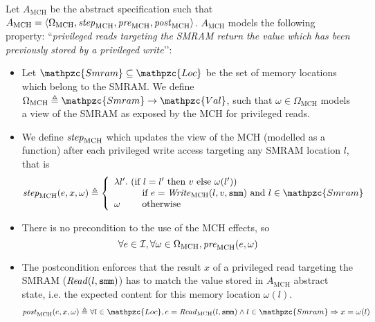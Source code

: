 \begin{example} \label{ex:mch-abs-specs} Let
  $A_{\mathrm{MCH}}$ be the abstract specification such that
  $A_{\mathrm{MCH}} = \langle \Omega_{\mathrm{MCH}}, \mathit{step}_{\mathrm{MCH}},
  \mathit{pre}_{\mathrm{MCH}}, \mathit{post}_{\mathrm{MCH}} \rangle$.
  $A_{\mathrm{MCH}}$ models the following property: ``\emph{privileged reads
    targeting the SMRAM return the value which has been previously stored by a
    privileged write}’’:
  \begin{itemize}
  \item Let $\mathpzc{Smram} \subseteq \mathpzc{Loc}$ be the set of memory
    locations which belong to the SMRAM.  We define
    $\Omega_{\mathrm{MCH}} \triangleq \mathpzc{Smram} \rightarrow
    \mathpzc{Val}$, such that $\omega \in \Omega_{\mathrm{MCH}}$ models a view
    of the SMRAM as exposed by the MCH for privileged reads.
  \item We define $\mathit{step}_{\mathrm{MCH}}$ which updates the view of the MCH
    (modelled as a function) after each privileged write access targeting any
    SMRAM location $l$, that is
    \[ \func{step}_{\mathrm{MCH}}(e, x, \omega) \triangleq \left\{
        \begin{array}{l}
          \lambda l'.  \text{ (if } l = l' \text{ then } v \text{ else } \omega(l')) \\
          \qquad\ \ \text{ if } e = \func{Write}_{\mathrm{MCH}}(l, v, \val{smm})
          \text{ and } l \in \mathpzc{Smram} \\
          \omega \qquad \text{ otherwise}
        \end{array}
      \right.
    \]
  \item There is no precondition to the use of the MCH effects, so
    \[ \forall e \in \mathcal{I},\forall \omega \in \Omega_{\mathrm{MCH}},
      \mathit{pre}_{\mathrm{MCH}}(e, \omega) \]
  \item The postcondition enforces that the result $x$ of a privileged read
    targeting the SMRAM ($\mathit{Read}(l, \mathtt{smm})$) has to match the value
    stored in $A_{\mathrm{MCH}}$ abstract state, i.e. the expected content for
    this memory location $\omega(l)$.
    \[ \func{post}_{\mathrm{MCH}}(e, x, \omega) \triangleq \forall l \in
      \mathpzc{Loc}, e = \func{Read}_{\mathrm{MCH}}(l, \val{smm}) \wedge l \in
      \mathpzc{Smram} \Rightarrow x = \omega(l)
    \]
  \end{itemize}
\end{example}

